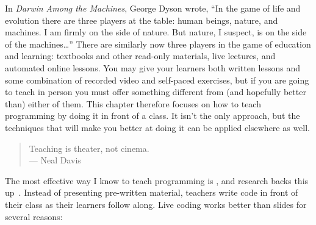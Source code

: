 
In \emph{Darwin Among the Machines},
George Dyson wrote,
``In the game of life and evolution there are three players at the table:
human beings, nature, and machines.
I am firmly on the side of nature.
But nature, I suspect, is on the  side of the machines{\ldots}''
There are similarly now three players in the game of education and learning:
textbooks and other read-only materials,
live lectures,
and automated online lessons.
You may give your learners both written lessons
and some combination of recorded video and self-paced exercises,
but if you are going to teach in person
you must offer something different from (and hopefully better than) either of them.
This chapter therefore focuses on how to teach programming by doing it in front of a class.
It isn't the only approach,
but the techniques that will make you better at doing it
can be applied elsewhere as well.


\begin{quote}

  Teaching is theater, not cinema. \\
  --- Neal Davis

\end{quote}

The most effective way I know to teach programming is ,
and research backs this up~\cite{Rubi2013,Haar2017}.
Instead of presenting pre-written material,
teachers write code in front of their class as their learners follow along.
Live coding works better than slides for several reasons:

